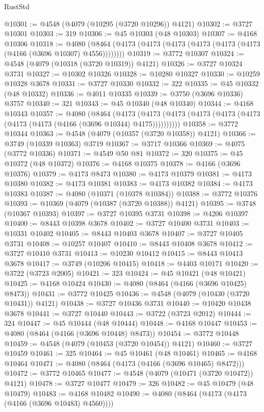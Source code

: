 \begin{lexlean}{RustStd}
\begin{coremodule}
@10301 := @4548 (@4079 (@10295 (@3720 @10296)) @4121)
@10302 := @3727 @10301
@10303 := 319
@10306 := @45 @10303 (@48 @10303)
@10307 := @4168 @10306
@10318 := @4080 (@8464 (@4173 (@4173 (@4173 (@4173 (@4173 (@4173 (@4166 (@3696 @10307) @4556))))))))
@10319 := @3772 @10307
@10324 := @4548 (@4079 (@10318 (@3720 @10319)) @4121)
@10326 := @3727 @10324 @3731
@10327 := @10302 @10326
@10328 := @10280 @10327
@10330 := @10259 @10328 @3678
@10331 := @3727 @10330
@10332 := 322
@10335 := @45 @10332 (@48 @10332)
@10336 := @4011 @10335
@10339 := @3750 (@3696 @10336) @3757
@10340 := 321
@10343 := @45 @10340 (@48 @10340)
@10344 := @4168 @10343
@10357 := @4080
    (@8464
      (@4173 (@4173 (@4173 (@4173 (@4173 (@4173 (@4173 (@4173 (@4166 (@3696 @10344) @4175))))))))))
@10358 := @3772 @10344
@10363 := @4548 (@4079 (@10357 (@3720 @10358)) @4121)
@10366 := @3749 (@10339 @10363) @3719
@10367 := @3717 @10366
@10369 := @4075 (@3772 @10336)
@10371 := @4549 @50 @81
@10372 := 320
@10375 := @45 @10372 (@48 @10372)
@10376 := @4168 @10375
@10378 := @4166 (@3696 @10376)
@10379 := @4173 @8473
@10380 := @4173 @10379
@10381 := @4173 @10380
@10382 := @4173 @10381
@10383 := @4173 @10382
@10384 := @4173 @10383
@10387 := @4080 (@10371 (@10378 @10384))
@10388 := @3772 @10376
@10393 := @10369 (@4079 (@10387 (@3720 @10388)) @4121)
@10395 := @3748 (@10367 @10393)
@10397 := @3727 @10395 @3731
@10398 := @4206 @10397
@10400 := @8443 @10398 @3678
@10402 := @3727 @10400 @3731
@10403 := @10331 @10402
@10405 := @8443 @10403 @3678
@10407 := @3727 @10405 @3731
@10408 := @10257 @10407
@10410 := @8443 @10408 @3678
@10412 := @3727 @10410 @3731
@10413 := @10230 @10412
@10415 := @8443 @10413 @3678
@10417 := @3749 (@10206 @10415)
@10418 := @4403 @10171
@10420 := @3722 (@3723 @2005)
@10421 := 323
@10424 := @45 @10421 (@48 @10421)
@10425 := @4168 @10424
@10430 := @4080 (@8464 (@4166 (@3696 @10425) @8473))
@10431 := @3772 @10425
@10436 := @4548 (@4079 (@10430 (@3720 @10431)) @4121)
@10438 := @3727 @10436 @3731
@10440 := @10420 @10438 @3678
@10441 := @3727 @10440
@10443 := @3722 (@3723 @2012)
@10444 := 324
@10447 := @45 @10444 (@48 @10444)
@10448 := @4168 @10447
@10453 := @4080 (@8464 (@4166 (@3696 @10448) @8473))
@10454 := @3772 @10448
@10459 := @4548 (@4079 (@10453 (@3720 @10454)) @4121)
@10460 := @3727 @10459
@10461 := 325
@10464 := @45 @10461 (@48 @10461)
@10465 := @4168 @10464
@10471 := @4080 (@8464 (@4173 (@4166 (@3696 @10465) @8472)))
@10472 := @3772 @10465
@10477 := @4548 (@4079 (@10471 (@3720 @10472)) @4121)
@10478 := @3727 @10477
@10479 := 326
@10482 := @45 @10479 (@48 @10479)
@10483 := @4168 @10482
@10490 := @4080 (@8464 (@4173 (@4173 (@4166 (@3696 @10483) @4560))))

\end{coremodule}
\end{lexlean}

